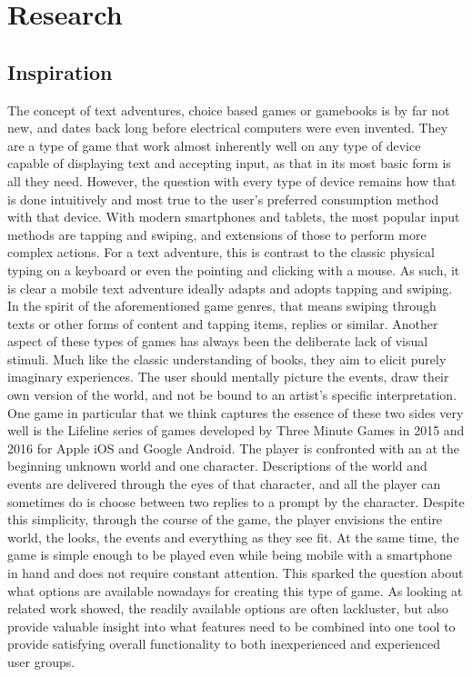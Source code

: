 
\chapter{Research}\label{chapter:research}

\section{Inspiration}
The concept of text adventures, choice based games or gamebooks is by far not new, and dates back long before electrical computers were even invented. They are a type of game that work almost inherently well on any type of device capable of displaying text and accepting input, as that in its most basic form is all they need. However, the question with every type of device remains how that is done intuitively and most true to the user's preferred consumption method with that device. With modern smartphones and tablets, the most popular input methods are tapping and swiping, and extensions of those to perform more complex actions. For a text adventure, this is contrast to the classic physical typing on a keyboard or even the pointing and clicking with a mouse. As such, it is clear a mobile text adventure ideally adapts and adopts tapping and swiping. In the spirit of the aforementioned game genres, that means swiping through texts or other forms of content and tapping items, replies or similar. 
Another aspect of these types of games has always been the deliberate lack of visual stimuli. Much like the classic understanding of books, they aim to elicit purely imaginary experiences. The user should mentally picture the events, draw their own version of the world, and not be bound to an artist's specific interpretation. 
One game in particular that we think captures the essence of these two sides very well is the Lifeline series of games developed by Three Minute Games in 2015 and 2016 for Apple iOS and Google Android\cite{LIFE}. The player is confronted with an at the beginning unknown world and one character. Descriptions of the world and events are delivered through the eyes of that character, and all the player can sometimes do is choose between two replies to a prompt by the character. Despite this simplicity, through the course of the game, the player envisions the entire world, the looks, the events and everything as they see fit. At the same time, the game is simple enough to be played even while being mobile with a smartphone in hand and does not require constant attention. 
This sparked the question about what options are available nowadays for creating this type of game. As looking at related work showed, the readily available options are often lackluster, but also provide valuable insight into what features need to be combined into one tool to provide satisfying overall functionality to both inexperienced and experienced user groups.

